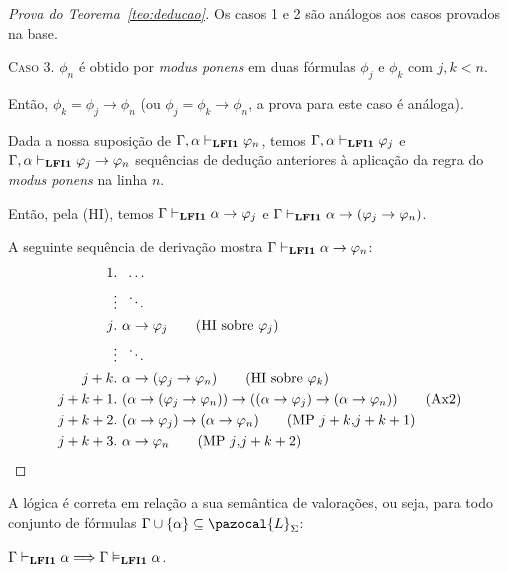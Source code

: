 \begin{proof}[Prova do Teorema~\ref{teo:deducao}]
         Os casos 1 e 2 são análogos aos casos provados na base.

         \noindent \textsc{Caso 3.} $\phi_{n}$ é obtido por \textit{modus ponens} em duas fórmulas $\phi_{j}$ e $\phi_{k}$ com $j, k < n$. 
         
         Então, $\phi_{k} = \phi_{j} \to \phi_{n}$ (ou $\phi_{j} = \phi_{k} \to \phi_{n}$, a prova para este caso é análoga). 
         
         Dada a nossa suposição de $\Gamma, \alpha \vdash_{\textbf{LFI1}{}} \varphi_{n}$, temos $\Gamma, \alpha \vdash_{\textbf{LFI1}{}} \varphi_{j}$ e $\Gamma, \alpha \vdash_{\textbf{LFI1}{}} \varphi_{j} \to \varphi_{n}$ sequências de dedução anteriores à aplicação da regra do \textit{modus ponens} na linha $n$. 
         
         Então, pela (HI), temos $\Gamma \vdash_{\textbf{LFI1}{}} \alpha \to \varphi_{j}$ e $\Gamma \vdash_{\textbf{LFI1}{}} \alpha \to (\varphi_{j} \to \varphi_{n})$. 
         
         A seguinte sequência de derivação mostra $\Gamma \vdash_{\textbf{LFI1}{}} \alpha \to \varphi_{n}$:
         \begin{align*}
             \text{1}&.~ \; \ldots\\
             &\vdots \; ~\ddots\\
             \text{$j$}&.~ \alpha \to \phi_{j} \tag{HI sobre $\phi_{j}$}\\
             &\vdots \; ~\ddots\\
             \text{$j + k$}&.~ \alpha \to (\phi_{j} \to \phi_{n}) \tag{HI sobre $\phi_{k}$}\\
             \text{$j + k + 1$}&.~ (\alpha \to (\phi_{j} \to \phi_{n})) \to ((\alpha \to \phi_{j}) \to (\alpha \to \phi_{n})) \tag{Ax2}\\
             \text{$j + k + 2$}&.~ (\alpha \to \phi_{j}) \to (\alpha \to \phi_{n}) \tag{MP $j + k$,$j + k + 1$}\\
              \text{$j + k + 3$}&.~ \alpha \to \phi_{n} \tag{MP $j$,$j + k + 2$}
         \end{align*}
    \end{proof}

    \begin{teorema}[Correção]
        \label{teo:correcao}
        A lógica \lfium{} é correta em relação a sua semântica de valorações, ou seja, para todo conjunto de fórmulas $\Gamma \cup \{\alpha\} \subseteq \pazocal{L}_{\Sigma}$:

        \centering
        $\Gamma \vdash_{\textbf{LFI1}{}} \alpha \Longrightarrow \Gamma \vDash_{\textbf{LFI1}{}} \alpha$.
    \end{teorema}

